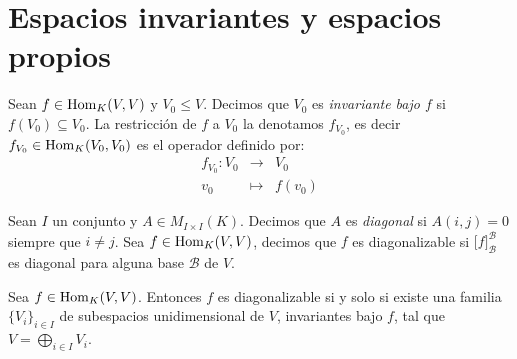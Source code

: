 \section{Espacios invariantes y espacios propios}

\begin{defn}
Sean $f\in\operatorname{Hom}_K(V,V)$ y $V_0\le V$. Decimos que $V_0$ es \emph{invariante bajo $f$} si $f(V_0)\subseteq V_0$. La restricci\'on de $f$ a $V_0$ la denotamos $f_{V_0}$, es decir $f_{V_0}\in\operatorname{Hom}_K(V_0,V_0)$ es el operador definido por:
\begin{eqnarray*}
f_{V_0}: V_0 & \longrightarrow & V_0\\
 v_0 & \longmapsto & f(v_0)
\end{eqnarray*}
\end{defn}

\begin{defn}
Sean $I$ un conjunto y $A\in M_{I\times I}(K)$. Decimos que $A$ es \emph{diagonal} si $A(i,j)=0$ siempre que $i\ne j$. Sea $f\in\operatorname{Hom}_K(V,V)$, decimos que $f$ es diagonalizable si $\Big[f\Big]^{\mathcal{B}}_{\mathcal{B}}$ es diagonal para alguna base $\mathcal{B}$ de $V$.
\end{defn}

\begin{teo}\label{diagosiysolosi}
Sea $f\in\operatorname{Hom}_K(V,V)$. Entonces $f$ es diagonalizable si y solo si existe una familia $\{V_i\}_{i\in I}$ de subespacios unidimensional de $V$, invariantes bajo $f$, tal que $V=\bigoplus_{i\in I}V_i$.
\end{teo}

